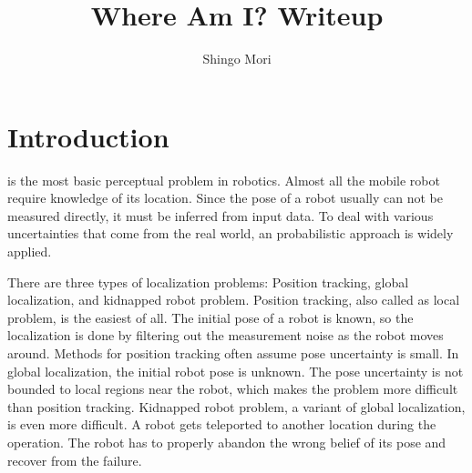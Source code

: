 \documentclass[10pt,journal,compsoc]{IEEEtran}
\begin{document}
\title{Where Am I? Writeup}

\author{Shingo Mori}

%
{}

\maketitle
\IEEEdisplaynontitleabstractindextext
\IEEEpeerreviewmaketitle
\section{Introduction}
\label{sec:introduction}

 is the most basic perceptual problem in robotics. Almost all the mobile robot require knowledge of its location. Since the pose of a robot usually can not be measured directly, it must be inferred from input data. To deal with various uncertainties that come from the real world, an probabilistic approach \cite{Thrun:2005:PR:1121596} is widely applied. 

There are three types of localization problems: Position tracking, global localization, and kidnapped robot problem. Position tracking, also called as local problem, is the easiest of all. The initial pose of a robot is known, so the localization is done by filtering out the measurement noise as the robot moves around. Methods for position tracking often assume pose uncertainty is small. In global localization, the initial robot pose is unknown. The pose uncertainty is not bounded to local regions near the robot, which makes the problem more difficult than position tracking. Kidnapped robot problem, a variant of global localization, is even more difficult. A robot gets teleported to another location during the operation. The robot has to properly abandon the wrong belief of its pose and recover from the failure.
\end{document}
